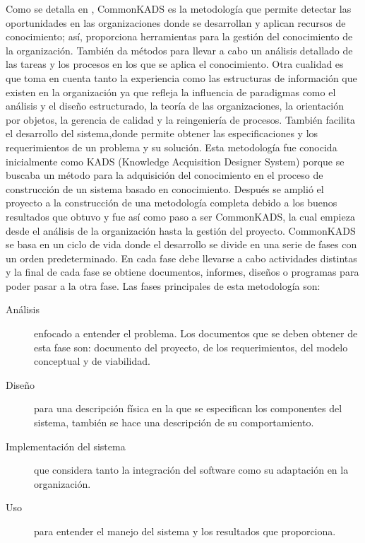Como se detalla en \citealt{Henao01}, CommonKADS es la metodología que permite detectar las oportunidades en las organizaciones donde se desarrollan y aplican recursos de conocimiento; así, proporciona herramientas para la gestión del conocimiento de la organización. También da métodos para llevar a cabo un análisis detallado de las tareas y los procesos en los que se aplica el conocimiento. Otra cualidad es que toma en cuenta tanto la experiencia como las estructuras de información que existen en la organización ya que refleja la influencia de paradigmas como el análisis y el diseño estructurado, la teoría de las organizaciones, la orientación por objetos, la gerencia de calidad y la reingeniería de procesos. También facilita el desarrollo del sistema,donde permite obtener las especificaciones y los requerimientos de un problema y su solución.
Esta metodología fue conocida inicialmente como KADS (Knowledge Acquisition Designer System) porque se buscaba un método para la adquisición del conocimiento en el proceso de construcción de un sistema basado en conocimiento. Después se amplió el proyecto a la construcción de una metodología completa debido a los buenos resultados que obtuvo y fue así como paso a ser CommonKADS, la cual empieza desde el análisis de la organización hasta la gestión del proyecto.
CommonKADS se basa en un ciclo de vida donde el desarrollo se divide en una serie de fases con un orden predeterminado. En cada fase debe llevarse a cabo actividades distintas y la final de cada fase se obtiene documentos, informes, diseños o programas para poder pasar a la otra fase. Las fases principales de esta metodología son:

\begin{description}
\item[Análisis] enfocado a entender el problema. Los documentos que se deben obtener de esta fase son: documento del proyecto, de los requerimientos, del modelo conceptual y de viabilidad.
\item[Diseño] para una descripción física en la que se especifican los componentes del sistema, también se hace una descripción de su comportamiento.
\item[Implementación del sistema] que considera tanto la integración del software como su adaptación en la organización.
\item[Uso] para entender el manejo del sistema y los resultados que proporciona.
\end{description}

